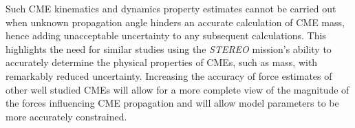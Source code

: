 Such CME kinematics and dynamics property estimates cannot be carried out when unknown propagation angle hinders an accurate calculation of CME mass, hence adding unacceptable uncertainty to any subsequent calculations. This highlights the need for similar studies using the \emph{STEREO} mission's ability to accurately determine the physical properties of CMEs, such as mass, with remarkably reduced uncertainty. Increasing the accuracy of force estimates of other well studied CMEs will allow for a more complete view of the magnitude of the forces influencing CME propagation and will allow model parameters to be more accurately constrained.




